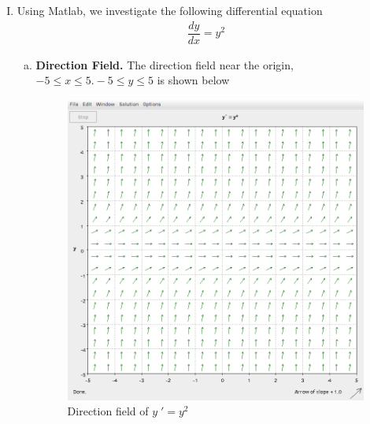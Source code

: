 \documentclass[a4paper,12pt]{article}
\begin{document}
\begin{enumerate}[I.]
  \item Using Matlab, we investigate the following differential equation
  \begin{align*}
    \dfrac{dy}{dx} = y^2
  \end{align*}
  \begin{enumerate}[a)]
    \item \textbf{Direction Field.} The direction field near the origin, $-5 \leq x \leq 5. -5 \leq y \leq 5$ is shown below
    \begin{figure}[H]
      \begin{center}
        \includegraphics[scale=.3]{21.png}
        \caption{Direction field of $y\;' = y^2$}
        \label{fig:3}
      \end{center}
    \end{figure}
    

\end{enumerate}
\end{enumerate}
\end{document}

